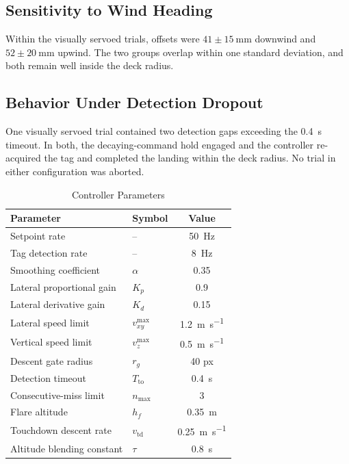 \subsection{Sensitivity to Wind Heading}

Within the visually servoed trials, offsets were
$41 \pm \SI{15}{\milli\meter}$ downwind and $52 \pm \SI{20}{\milli\meter}$
upwind. The two groups overlap within one standard deviation, and both remain
well inside the deck radius.

\subsection{Behavior Under Detection Dropout}

One visually servoed trial contained two detection gaps exceeding the
\SI{0.4}{\second} timeout. In both, the decaying-command hold engaged and the
controller re-acquired the tag and completed the landing within the deck radius.
No trial in either configuration was aborted.


\begin{table}[!t]
\caption{Controller Parameters}
\label{tab:params}
\centering
\small
\setlength{\tabcolsep}{4pt}
\begin{tabular}{llc}
\toprule
Parameter & Symbol & Value \\
\midrule
Setpoint rate                 & --                    & \SI{50}{\hertz} \\
Tag detection rate            & --                    & \SI{8}{\hertz} \\
Smoothing coefficient         & $\alpha$              & 0.35 \\
Lateral proportional gain     & $K_p$                 & 0.9 \\
Lateral derivative gain       & $K_d$                 & 0.15 \\
Lateral speed limit           & $v^{\max}_{xy}$       & \SI{1.2}{\meter\per\second} \\
Vertical speed limit          & $v^{\max}_{z}$        & \SI{0.5}{\meter\per\second} \\
Descent gate radius           & $r_g$                 & 40 px \\
Detection timeout             & $T_{\mathrm{to}}$     & \SI{0.4}{\second} \\
Consecutive-miss limit        & $n_{\max}$            & 3 \\
Flare altitude                & $h_f$                 & \SI{0.35}{\meter} \\
Touchdown descent rate        & $v_{\mathrm{td}}$     & \SI{0.25}{\meter\per\second} \\
Altitude blending constant    & $\tau$                & \SI{0.8}{\second} \\
\bottomrule
\end{tabular}
\end{table}

